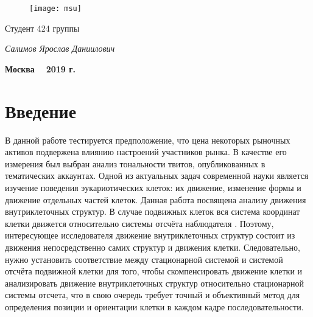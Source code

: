 \documentclass[oneside,final,14pt]{extreport}
\begin{document}
\begin{titlepage}
\begin{figure}[t!]
\centering
\texttt{[image: msu]}
\end{figure}
\begin{centering}



\vskip1cm
\vskip1cm
\Large

\end{centering}
\vskip2cm
\normalsize
\begin{flushright}

Студент 424 группы

\emph{Салимов Ярослав Даниилович}


\end{flushright}
\vfill
\centerline{\bf Москва ~ \bf 2019 \bf г.}
\end{titlepage}
\setcounter{page}{2}
\renewcommand{\contentsname}{Cодержание}
\tableofcontents

\chapter{Введение}
В данной работе тестируется предположение, что цена некоторых рыночных активов подвержена влиянию настроений участников рынка. 
В качестве его измерения был выбран анализ тональности твитов, опубликованных в тематических аккаунтах.
Одной из актуальных задач современной науки является изучение поведения эукариотических клеток: их движение, изменение формы и движение отдельных частей клеток. Данная работа посвящена анализу движения внутриклеточных структур. В случае подвижных клеток вся система координат клетки движется относительно системы отсчёта наблюдателя \cite{rafelski2004crawling}. Поэтому, интересующее исследователя движение внутриклеточных структур состоит из движения непосредственно самих структур и движения клетки. Следовательно, нужно установить соответствие между стационарной системой и системой отсчёта подвижной клетки для того, чтобы скомпенсировать движение клетки и анализировать движение внутриклеточных структур относительно стационарной системы отсчета, что в свою очередь требует точный и объективный метод для определения позиции и ориентации клетки в каждом кадре последовательности.
\end{document}
